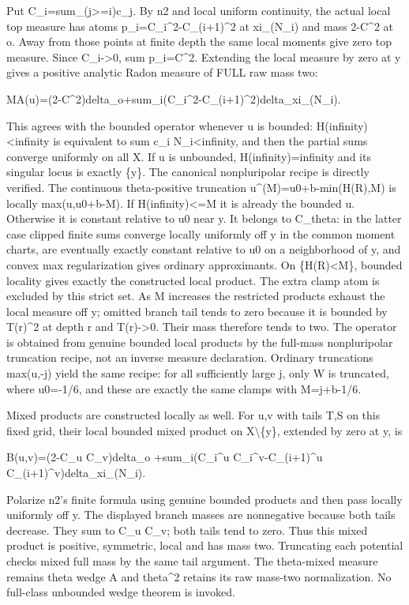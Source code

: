 \documentclass[11pt]{article}
\begin{document}
Put C\_i=sum\_(j>=i)c\_j. By n2 and local uniform continuity, the actual local top measure has atoms p\_i=C\_i\textasciicircum{}2-C\_(i+1)\textasciicircum{}2 at xi\_(N\_i) and mass 2-C\textasciicircum{}2 at o. Away from those points at finite depth the same local moments give zero top measure. Since C\_i->0, sum p\_i=C\textasciicircum{}2. Extending the local measure by zero at y gives a positive analytic Radon measure of FULL raw mass two:

MA(u)=(2-C\textasciicircum{}2)delta\_o+sum\_i(C\_i\textasciicircum{}2-C\_(i+1)\textasciicircum{}2)delta\_xi\_(N\_i).

This agrees with the bounded operator whenever u is bounded: H(infinity)<infinity is equivalent to sum c\_i N\_i<infinity, and then the partial sums converge uniformly on all X. If u is unbounded, H(infinity)=infinity and its singular locus is exactly \{y\}. The canonical nonpluripolar recipe is directly verified. The continuous theta-positive truncation u\textasciicircum{}(M)=u0+b-min(H(R),M) is locally max(u,u0+b-M). If H(infinity)<=M it is already the bounded u. Otherwise it is constant relative to u0 near y. It belongs to C\_theta: in the latter case clipped finite sums converge locally uniformly off y in the common moment charts, are eventually exactly constant relative to u0 on a neighborhood of y, and convex max regularization gives ordinary approximants. On \{H(R)<M\}, bounded locality gives exactly the constructed local product. The extra clamp atom is excluded by this strict set. As M increases the restricted products exhaust the local measure off y; omitted branch tail tends to zero because it is bounded by T(r)\textasciicircum{}2 at depth r and T(r)->0. Their mass therefore tends to two. The operator is obtained from genuine bounded local products by the full-mass nonpluripolar truncation recipe, not an inverse measure declaration. Ordinary truncations max(u,-j) yield the same recipe: for all sufficiently large j, only W is truncated, where u0=-1/6, and these are exactly the same clamps with M=j+b-1/6.

Mixed products are constructed locally as well. For u,v with tails T,S on this fixed grid, their local bounded mixed product on X\textbackslash{}\{y\}, extended by zero at y, is

B(u,v)=(2-C\_u C\_v)delta\_o
        +sum\_i(C\_i\textasciicircum{}u C\_i\textasciicircum{}v-C\_(i+1)\textasciicircum{}u C\_(i+1)\textasciicircum{}v)delta\_xi\_(N\_i).

Polarize n2's finite formula using genuine bounded products and then pass locally uniformly off y. The displayed branch masses are nonnegative because both tails decrease. They sum to C\_u C\_v; both tails tend to zero. Thus this mixed product is positive, symmetric, local and has mass two. Truncating each potential checks mixed full mass by the same tail argument. The theta-mixed measure remains theta wedge A and theta\textasciicircum{}2 retains its raw mass-two normalization. No full-class unbounded wedge theorem is invoked.
\end{document}
